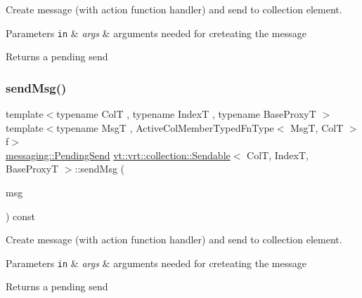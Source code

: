 Create message (with action function handler) and send to collection element. 


\begin{DoxyParams}[1]{Parameters}
\mbox{\tt in}  & {\em args} & arguments needed for creteating the message\\
\hline
\end{DoxyParams}
\begin{DoxyReturn}{Returns}
a pending send 
\end{DoxyReturn}
\mbox{\label{structvt_1_1vrt_1_1collection_1_1_sendable_a1bae1b58a1ce80fd76ee43ff4d33905a}} 
\subsubsection{\texorpdfstring{send\+Msg()}{sendMsg()}\hspace{0.1cm}{\footnotesize\ttfamily [1/3]}}
{\footnotesize\ttfamily template$<$typename ColT , typename IndexT , typename Base\+ProxyT $>$ \\
template$<$typename MsgT , Active\+Col\+Member\+Typed\+Fn\+Type$<$ Msg\+T, Col\+T $>$ f$>$ \\
\hyperlink{structvt_1_1messaging_1_1_pending_send}{messaging\+::\+Pending\+Send} \hyperlink{structvt_1_1vrt_1_1collection_1_1_sendable}{vt\+::vrt\+::collection\+::\+Sendable}$<$ ColT, IndexT, Base\+ProxyT $>$\+::send\+Msg (\begin{DoxyParamCaption}\item[{\hyperlink{structvt_1_1messaging_1_1_msg_ptr_thief}{messaging\+::\+Msg\+Ptr\+Thief}$<$ MsgT $>$}]{msg }\end{DoxyParamCaption}) const}



Create message (with action function handler) and send to collection element. 


\begin{DoxyParams}[1]{Parameters}
\mbox{\tt in}  & {\em args} & arguments needed for creteating the message\\
\hline
\end{DoxyParams}
\begin{DoxyReturn}{Returns}
a pending send 
\end{DoxyReturn}
\mbox{\label{structvt_1_1vrt_1_1collection_1_1_sendable_a1bae1b58a1ce80fd76ee43ff4d33905a}} 
